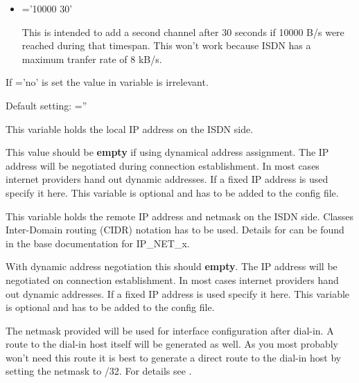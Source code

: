 \begin{description}
\begin{itemize}
  \item {}='10000 30'
    
    This is intended to add a second channel after 30 seconds if 10000
    B/s were reached during that timespan. This won't work because ISDN 
    has a maximum tranfer rate of 8 kB/s.

  \end{itemize}
  
  If ='no' is set the value in
  variable \linebreak {} is irrelevant.
  
  Default setting: =''


    
  This variable holds the local IP address on the ISDN side.
  
  This value should be \textbf{empty} if using dynamical address assignment. 
  The IP address will be negotiated during connection establishment. In 
  most cases internet providers hand out dynamic addresses. If a fixed IP 
  address is used specify it here. This variable is optional and has to 
  be added to the config file.

    
  This variable holds the remote IP address and netmask on the ISDN side. 
  Classes Inter-Domain routing (CIDR) notation has to be used. Details for 
   can be found in the base documentation for IP\_NET\_x.
  
  With dynamic address negotiation this should \textbf{empty}. The IP address 
  will be negotiated on connection establishment. In most cases internet 
  providers hand out dynamic addresses. If a fixed IP address is used 
  specify it here. This variable is optional and has to be added to 
  the config file.

  The netmask provided will be used for interface configuration after dial-in. 
  A route to the dial-in host itself will be generated as well. As you most 
  probably won't need this route it is best to generate a direct route to 
  the dial-in host by setting the netmask to /32. For details see
  .


  

\end{description}

